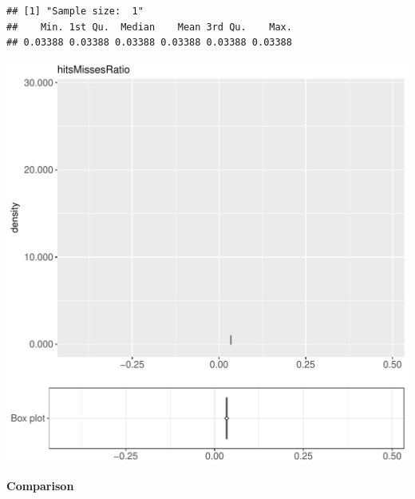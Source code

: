 \documentclass{article}\usepackage[]{graphicx}\usepackage[]{color}
\makeatletter
\def\maxwidth{ %
  \ifdim\Gin@nat@width>\linewidth
    \linewidth
  \else
    \Gin@nat@width
  \fi
}
\newenvironment{kframe}{%
 \def\at@end@of@kframe{}%
 \ifinner\ifhmode%
  \def\at@end@of@kframe{\end{minipage}}%
  \begin{minipage}{\columnwidth}%
 \fi\fi%
 \def\FrameCommand##1{\hskip\@totalleftmargin \hskip-\fboxsep
 \colorbox{shadecolor}{##1}\hskip-\fboxsep
     \hskip-\linewidth \hskip-\@totalleftmargin \hskip\columnwidth}%
 \MakeFramed {\advance\hsize-\width
   \@totalleftmargin\z@ \linewidth\hsize
   \@setminipage}}%
 {\par\unskip\endMakeFramed%
 \at@end@of@kframe}
\newenvironment{knitrout}{}{} %
\makeatother
\begin{document}
\begin{knitrout}
\color{fgcolor}\begin{kframe}
\begin{verbatim}
## [1] "Sample size:  1"
##    Min. 1st Qu.  Median    Mean 3rd Qu.    Max. 
## 0.03388 0.03388 0.03388 0.03388 0.03388 0.03388
\end{verbatim}


{\ttfamily\noindent\bfseries{}}\end{kframe}
\includegraphics[width=\maxwidth]{figure/RH5_trivialcaching_obscure-1} 

\end{knitrout}
  
 \textbf{Comparison}
  
\end{document}
